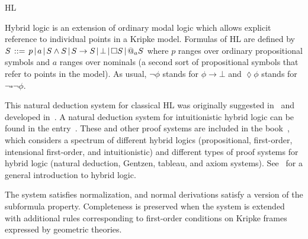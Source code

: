 \begin{entry}{HL}
\begin{clarifications}
  Hybrid logic is an extension of ordinary modal logic which allows explicit
  reference to individual points in a Kripke model. Formulas of HL are defined by
  $S \hspace{.5mm} ::= \hspace{.5mm} p \hspace{.5mm} | \hspace{.5mm} a
  \hspace{.5mm} | \hspace{.5mm} S \wedge S \hspace{.5mm} | \hspace{.5mm}
  S \rightarrow S \hspace{.5mm} | \hspace{.5mm} \bot \hspace{.5mm} |
  \hspace{.5mm} \square S \hspace{.5mm} | \hspace{.5mm} @_{a} S$
  where $p$ ranges over ordinary propositional symbols and $a$ ranges over
  nominals (a second sort of propositional symbols that refer to points in the
  model). As usual, $\neg \phi$ stands for $ \phi \rightarrow \bot$ and $\lozenge
  \phi$ stands for $\neg \square \neg \phi$.
\end{clarifications}

\begin{history}
  This natural deduction system for classical HL was originally suggested
  in~\cite{Brauner01c} and developed in~\cite{Brauner01b}. A natural deduction
  system for intuitionistic hybrid logic can be found in the entry~.
  These and other proof systems are included in the book~\cite{Brauner11a}, which
  considers a spectrum of different hybrid logics (propositional, first-order,
  intensional first-order, and intuitionistic) and different types of proof
  systems for hybrid logic (natural deduction, Gentzen, tableau, and axiom
  systems). See~\cite{AC06} for a general introduction to hybrid logic.
\end{history}

\begin{technicalities}
  The system satisfies normalization, and normal derivations satisfy a version of
  the subformula property. Completeness is preserved when the system is extended
  with additional rules corresponding to first-order conditions on Kripke frames
  expressed by geometric theories.
\end{technicalities}

\end{entry}
